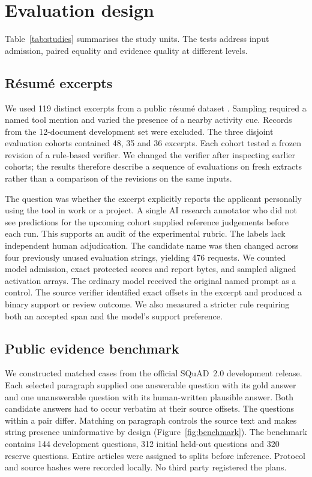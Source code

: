 \documentclass[11pt,a4paper]{article}
\begin{document}
\section{Evaluation design}

Table~\ref{tab:studies} summarises the study units. The tests address input admission, paired equality and evidence quality at different levels.


\subsection{Résumé excerpts}

We used 119 distinct excerpts from a public résumé dataset \citep{resume}. Sampling required a named tool mention and varied the presence of a nearby activity cue. Records from the 12-document development set were excluded. The three disjoint evaluation cohorts contained 48, 35 and 36 excerpts. Each cohort tested a frozen revision of a rule-based verifier. We changed the verifier after inspecting earlier cohorts; the results therefore describe a sequence of evaluations on fresh extracts rather than a comparison of the revisions on the same inputs.

The question was whether the excerpt explicitly reports the applicant personally using the tool in work or a project. A single AI research annotator who did not see predictions for the upcoming cohort supplied reference judgements before each run. This supports an audit of the experimental rubric. The labels lack independent human adjudication. The candidate name was then changed across four previously unused evaluation strings, yielding 476 requests. We counted model admission, exact protected scores and report bytes, and sampled aligned activation arrays. The ordinary model received the original named prompt as a control. The source verifier identified exact offsets in the excerpt and produced a binary support or review outcome. We also measured a stricter rule requiring both an accepted span and the model's support preference.

\subsection{Public evidence benchmark}

We constructed matched cases from the official SQuAD~2.0 development release. Each selected paragraph supplied one answerable question with its gold answer and one unanswerable question with its human-written plausible answer. Both candidate answers had to occur verbatim at their source offsets. The questions within a pair differ. Matching on paragraph controls the source text and makes string presence uninformative by design (Figure~\ref{fig:benchmark}). The benchmark contains 144 development questions, 312 initial held-out questions and 320 reserve questions. Entire articles were assigned to splits before inference. Protocol and source hashes were recorded locally. No third party registered the plans.
\end{document}

